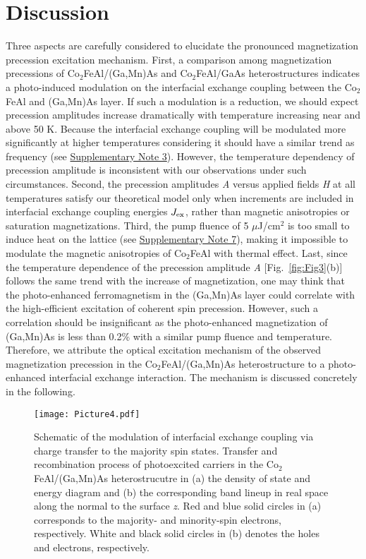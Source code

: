 \documentclass[%
 reprint,
superscriptaddress,
 amsmath,amssymb,
 aps,
prl,
]{revtex4-1}
\begin{document}
\section{\label{sec:Discussion}Discussion}

Three aspects are carefully considered to elucidate the pronounced magnetization precession excitation mechanism. First, a comparison among magnetization precessions  of Co$_2$FeAl/(Ga,Mn)As and Co$_2$FeAl/GaAs heterostructures indicates a photo-induced modulation on the interfacial exchange coupling between the Co$_2$FeAl and (Ga,Mn)As layer. If such a modulation is a reduction, we should expect precession amplitudes increase dramatically with temperature increasing near and above 50 K. Because the interfacial exchange coupling will be modulated more significantly at higher temperatures considering it should have a similar trend as frequency (see \hyperref[sec:Supplementary]{Supplementary Note 3}). However, the temperature dependency of precession amplitude is inconsistent with our observations under such circumstances. Second, the precession amplitudes \textit{A} versus applied fields \textit{H} at all temperatures satisfy our theoretical model only when increments are included in interfacial exchange coupling energies $J_\textup{ex}$, rather than magnetic anisotropies or saturation magnetizations. Third, the pump fluence of 5 $\mu$J/cm$^{2}$ is too small to induce heat on the lattice (see \hyperref[sec:Supplementary]{Supplementary Note 7}), making it impossible to modulate the magnetic anisotropies of Co$_2$FeAl with thermal effect. Last, since the temperature dependence of the precession amplitude \textit{A} [Fig.~\ref{fig:Fig3}(b)] follows the same trend with the increase of magnetization, one may think that the photo-enhanced ferromagnetism in the (Ga,Mn)As layer could correlate with the high-efficient excitation of coherent spin precession. However, such a correlation should be insignificant as the photo-enhanced magnetization of (Ga,Mn)As is less than 0.2\% with a similar pump fluence and temperature.\cite{28} Therefore, we attribute the optical excitation mechanism of the observed magnetization precession in the Co$_2$FeAl/(Ga,Mn)As heterostructure to a photo-enhanced interfacial exchange interaction. The mechanism is discussed concretely in the following.

\begin{figure}
    \texttt{[image: Picture4.pdf]}
    \caption{Schematic of the modulation of interfacial exchange coupling via charge transfer to the majority spin states. Transfer and recombination process of photoexcited carriers in the Co$_2$FeAl/(Ga,Mn)As heterostrucutre in (a) the density of state and energy diagram and (b) the corresponding band lineup in real space along the normal to the surface \textit{z}. Red and blue solid circles in (a) corresponds to the majority- and minority-spin electrons, respectively. White and black solid circles in (b) denotes the holes and electrons, respectively.
}
    \label{fig:Fig4}
\end{figure}
\end{document}
